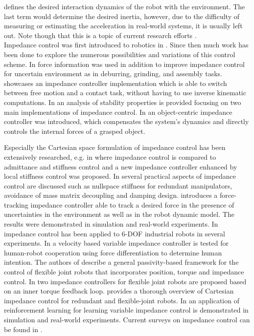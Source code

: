 defines the desired interaction dynamics of the robot with the environment.
The last term would determine the desired inertia, however, due to the difficulty of measuring or estimating the acceleration in real-world systems, it is usually left out. Note though that this is a topic of current research efforts \cite{birjandi2020observer}.
\\
Impedance control was first introduced to robotics in \cite{Hogan.661984681984,Hogan.1985,Hogan.1985b}.
Since then much work has been done to explore the numerous possibilities and variations of this control scheme.
In \cite{Anderson.1988} force information was used in addition to improve impedance control for uncertain environment as in deburring, grinding, and assembly tasks.
\cite{Hogan.1987} showcases an impedance controller implementation which is able to switch between free motion and a contact task, without having to use inverse kinematic computations.
In \cite{Lawrence.1988} an analysis of stability properties is provided focusing on two main implementations of impedance control.
In \cite{Schneider.1989} an object-centric impedance controller was introduced, which compensates the system's dynamics and directly controls the internal forces of a grasped object.

Especially the Cartesian space formulation of impedance control has been extensively researched, e.g. in \cite{AlbuSchaffer.2002} where impedance control is compared to admittance and stiffness control and a new impedance controller enhanced by local stiffness control was proposed.
In \cite{AlbuSchaffer.2003} several practical aspects of impedance control are discussed such as nullspace stiffness for redundant manipulators, avoidance of mass matrix decoupling and damping design.
\cite{Jung.2004} introduces a force-tracking impedance controller able to track a desired force in the presence of uncertainties in the environment as well as in the robot dynamic model.
The results were demonstrated in simulation and real-world experiments.
In \cite{Ferretti.2004} impedance control has been applied to 6-DOF industrial robots in several experiments.
In \cite{Duchaine.2007} a velocity based variable impedance controller is tested for human-robot cooperation using force differentiation to determine human intention.
The authors of \cite{AlbuSchaffer.2007} describe a general passivity-based framework for the control of flexible joint robots that incorporates position, torque and impedance control.
In \cite{Ott.2008} two impedance controllers for flexible joint robots are proposed based on an inner torque feedback loop.
\cite{Ott.2008b} provides a thorough overview of Cartesian impedance control for redundant and flexible-joint robots.
In \cite{Buchli.2011} an application of reinforcement learning for learning variable impedance control is demonstrated in simulation and real-world experiments.
Current surveys on impedance control can be found in \cite{Song.2017,Song.2019}.

